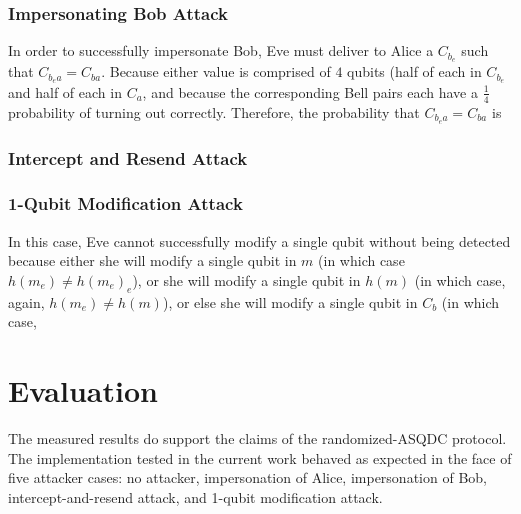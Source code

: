 \documentclass[conference]{IEEEtran}
\begin{document}
\subsubsection{Impersonating Bob Attack}

In order to successfully impersonate Bob, Eve must deliver to Alice
a $C_{b_{e}}$ such that $C_{b_{e}a}=C_{ba}$. Because either value
is comprised of $4$ qubits (half of each in $C_{b_{e}}$ and half
of each in $C_{a}$, and because the corresponding Bell pairs each
have a $\frac{1}{4}$ probability of turning out correctly. Therefore,
the probability that $C_{b_{e}a}=C_{ba}$ is $ $

\subsubsection{Intercept and Resend Attack}

\subsubsection{1-Qubit Modification Attack}

In this case, Eve cannot successfully modify a single qubit without
being detected because either she will modify a single qubit in $m$
(in which case $h\left(m_{e}\right)\neq h\left(m_{e}\right)_{e}$),
or she will modify a single qubit in $h\left(m\right)$ (in which
case, again, $h\left(m_{e}\right)\neq h\left(m\right)$), or else
she will modify a single qubit in $C_{b}$ (in which case, 

\section{Evaluation}

The measured results do support the claims of the randomized-ASQDC
protocol. The implementation tested in the current work behaved as
expected in the face of five attacker cases: no attacker, impersonation
of Alice, impersonation of Bob, intercept-and-resend attack, and 1-qubit
modification attack. 

\mydata
\end{document}
